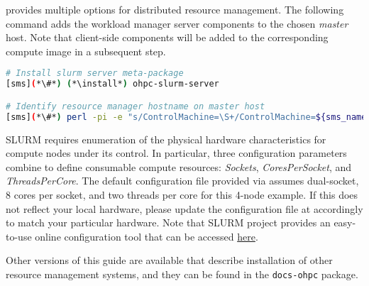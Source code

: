\OHPC{} provides multiple options for distributed resource management. 
The following command adds the \SLURM{} workload manager server components to the
chosen {\em master} host. Note that client-side components will be added to
the corresponding compute image in a subsequent step.

\begin{lstlisting}[language=bash,keywords={}]
# Install slurm server meta-package
[sms](*\#*) (*\install*) ohpc-slurm-server

# Identify resource manager hostname on master host
[sms](*\#*) perl -pi -e "s/ControlMachine=\S+/ControlMachine=${sms_name}/" /etc/slurm/slurm.conf
\end{lstlisting}

\begin{center}
\begin{tcolorbox}[]
  \small SLURM requires enumeration of the physical hardware characteristics
  for compute nodes under its control. In particular, three configuration
  parameters combine to define consumable compute resources: {\em Sockets},
  {\em CoresPerSocket}, and {\em ThreadsPerCore}. The default configuration
  file provided via \OHPC{} assumes dual-socket, 8 cores per socket, and two
  threads per core for this 4-node example. If this does not reflect your local
  hardware, please update the configuration file at
   accordingly to match your particular hardware.
  Note that SLURM project provides an easy-to-use online configuration tool that
  can be accessed
 \href{https://slurm.schedmd.com/configurator.html}{\color{blue} here}. 
\end{tcolorbox}
\end{center}

Other versions of this guide are available that describe installation of other
resource management systems, and they can be found in the \texttt{docs-ohpc}
package.

